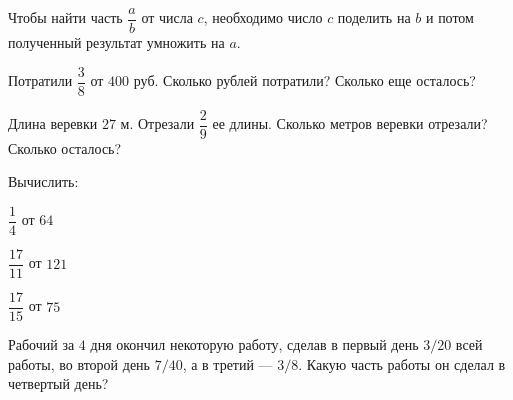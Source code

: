 \begin{definit}
	Чтобы найти часть \( \dfrac{a}{b} \) от числа \( c \), необходимо число \( c \) поделить на \( b \) и потом полученный результат умножить на \( a \).
\end{definit}
\begin{listofex}[resume]
	\item Потратили \( \dfrac{3}{8} \) от \( 400 \) руб. Сколько рублей потратили? Сколько еще осталось?
	\item Длина веревки \( 27 \) м. Отрезали \( \dfrac{2}{9} \) ее длины. Сколько метров веревки отрезали? Сколько осталось?
	\item Вычислить:
	\begin{enumcols}[itemcolumns=3]
		\item \( \dfrac{1}{4} \) от \( 64 \)
		\item \( \dfrac{17}{11} \) от \( 121 \)
		\item \( \dfrac{17}{15} \) от \( 75 \)
	\end{enumcols}
	\item Рабочий за \( 4 \) дня окончил некоторую работу, сделав в первый день \( 3/20 \) всей работы, во второй день \( 7/40 \), а в третий --- \( 3/8 \). Какую часть работы он сделал в четвертый день?
\end{listofex}
\newpage
{}
